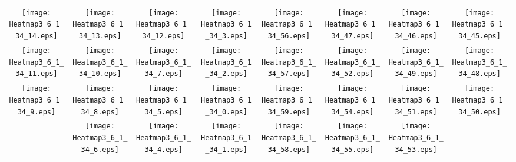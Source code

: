\documentclass{standalone}
\begin{document}
\begin{tabular}{ *8{c} }
\texttt{[image: Heatmap3\_6\_1\_34\_14.eps]} & \texttt{[image: Heatmap3\_6\_1\_34\_13.eps]} & \texttt{[image: Heatmap3\_6\_1\_34\_12.eps]} & \texttt{[image: Heatmap3\_6\_1\_34\_3.eps]} & \texttt{[image: Heatmap3\_6\_1\_34\_56.eps]} & \texttt{[image: Heatmap3\_6\_1\_34\_47.eps]} & \texttt{[image: Heatmap3\_6\_1\_34\_46.eps]} & \texttt{[image: Heatmap3\_6\_1\_34\_45.eps]} \\
\texttt{[image: Heatmap3\_6\_1\_34\_11.eps]} & \texttt{[image: Heatmap3\_6\_1\_34\_10.eps]} & \texttt{[image: Heatmap3\_6\_1\_34\_7.eps]} & \texttt{[image: Heatmap3\_6\_1\_34\_2.eps]} & \texttt{[image: Heatmap3\_6\_1\_34\_57.eps]} & \texttt{[image: Heatmap3\_6\_1\_34\_52.eps]} & \texttt{[image: Heatmap3\_6\_1\_34\_49.eps]} & \texttt{[image: Heatmap3\_6\_1\_34\_48.eps]} \\
\texttt{[image: Heatmap3\_6\_1\_34\_9.eps]} & \texttt{[image: Heatmap3\_6\_1\_34\_8.eps]} & \texttt{[image: Heatmap3\_6\_1\_34\_5.eps]} & \texttt{[image: Heatmap3\_6\_1\_34\_0.eps]} & \texttt{[image: Heatmap3\_6\_1\_34\_59.eps]} & \texttt{[image: Heatmap3\_6\_1\_34\_54.eps]} & \texttt{[image: Heatmap3\_6\_1\_34\_51.eps]} & \texttt{[image: Heatmap3\_6\_1\_34\_50.eps]} \\
 & \texttt{[image: Heatmap3\_6\_1\_34\_6.eps]} & \texttt{[image: Heatmap3\_6\_1\_34\_4.eps]} & \texttt{[image: Heatmap3\_6\_1\_34\_1.eps]} & \texttt{[image: Heatmap3\_6\_1\_34\_58.eps]} & \texttt{[image: Heatmap3\_6\_1\_34\_55.eps]} & \texttt{[image: Heatmap3\_6\_1\_34\_53.eps]} &  
\end{tabular}
\end{document}
